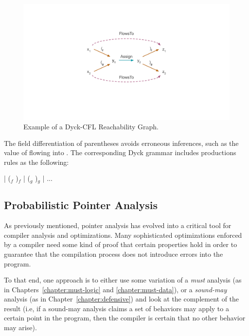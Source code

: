 \begin{figure}[ht]
\centering
\includegraphics[trim={40mm 40mm 40mm 30mm},clip,width=1\linewidth]{assets/related/DyckCFL.pdf}
\caption[Example of a Dyck-CFL-Reachability Graph]{Example of a Dyck-CFL Reachability Graph.}
\label{fig:related:dyck-cfl}
\end{figure}

The field differentiation of parentheses avoids erroneous inferences, such as the value of  flowing into . The corresponding Dyck grammar includes productions rules as the following:

\begin{displayquote}
\begin{datalog}
 \dlIfInv{}  | ($_f$  )$_f$ | ($_g$  )$_g$ | ...
\end{datalog}
\end{displayquote}


\subsection{Probabilistic Pointer Analysis}

As previously mentioned, pointer analysis has evolved into a critical tool for compiler analysis and optimizations. Many sophisticated optimizations enforced by a compiler need some kind of proof that certain properties hold in order to guarantee that the compilation process does not introduce errors into the program.

To that end, one approach is to either use some variation of a \emph{must} analysis (as in Chapters~\ref{chapter:must-logic} and \ref{chapter:must-data}), or a \emph{sound-may} analysis (as in Chapter~\ref{chapter:defensive}) and look at the complement of the result (i.e, if a sound-may analysis claims a set of behaviors may apply to a certain point in the program, then the compiler is certain that no other behavior may arise).

